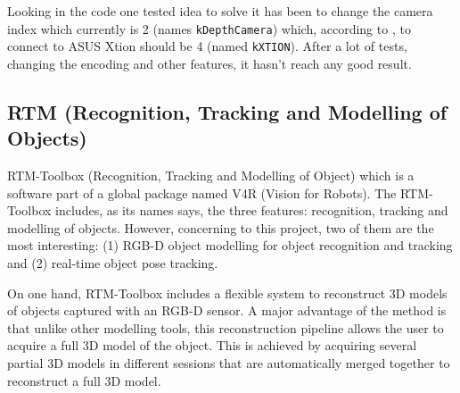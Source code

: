 \documentclass[12pt,a4paper,final,twoside,openright]{report}
\begin{document}
\break
Looking in the code one tested idea to solve it has been to change the camera index which currently is 2 (names \texttt{kDepthCamera}) which, according to \citep{Aldebaran}, to connect to ASUS Xtion should be 4 (named \texttt{kXTION}). After a lot of tests, changing the encoding and other features, it hasn't reach any good result. 

\subsection{RTM (Recognition, Tracking and Modelling of Objects)}
\label{sec:RTM}



RTM-Toolbox (Recognition, Tracking and Modelling of Object) \cite{Prankl2015} which is a software part of a global package named V4R (Vision for Robots). The RTM-Toolbox includes, as its names says, the three features: recognition, tracking and modelling of objects. However, concerning to this project, two of them are the most interesting: (1) RGB-D object modelling for object recognition and tracking and (2) real-time object pose tracking.

On one hand, RTM-Toolbox includes a flexible system to reconstruct 3D models of objects captured with an RGB-D sensor. A major advantage of the method is that unlike  other modelling tools, this reconstruction pipeline allows  the user to acquire a full 3D model of the object. This is  achieved by acquiring several partial 3D models in different sessions that are automatically merged together to reconstruct a full 3D model. 
\end{document}
